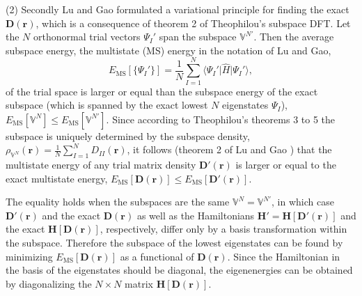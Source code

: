 \documentclass[journal=jpclcd,manuscript=letter]{achemso}
\newcommand\m[1]{\mathbf{#1}}
\renewcommand\vec[1]{\mathbf{#1}}
\begin{document}
(2) Secondly Lu and Gao formulated a variational principle for finding the exact $\m{D}(\vec{r})$, which is a consequence of theorem 2
of Theophilou's subspace DFT. \cite{Theophilou1979}
Let the $N$ orthonormal trial vectors $\Psi_I'$ span the subspace $\mathbb{V}^{N'}$.
Then the average subspace energy, the multistate (MS) energy in the notation of Lu and Gao,
\begin{equation}
  E_{\text{MS}}[\{\Psi_I'\}] = \frac{1}{N} \sum_{I=1}^{N} \langle \Psi_I' \vert \hat{H} \vert \Psi_I' \rangle,
\end{equation}
of the trial space is larger or equal than
the subspace energy of the exact subspace (which is spanned by the exact lowest $N$ eigenstates $\Psi_I$),
$E_{\text{MS}}[\mathbb{V}^N] \leq E_{\text{MS}}[\mathbb{V}^{N'}]$.
Since according to Theophilou's theorems 3 to 5 the subspace is uniquely determined by the subspace density,
$\rho_{\mathbb{V}^N}(\vec{r}) = \frac{1}{N} \sum_{I=1}^{N} D_{II}(\vec{r})$,
it follows (theorem 2 of Lu and Gao \cite{Lu2022JPCL}) that the multistate energy of any trial matrix density $\m{D}'(\vec{r})$
is larger or equal to the exact multistate energy,
 $E_{\text{MS}}[\m{D}(\vec{r})] \leq E_{\text{MS}}[\m{D}'(\vec{r})]$.

The equality holds when the subspaces are the same $\mathbb{V}^N = \mathbb{V}^{N'}$, in which case $\m{D}'(\vec{r})$ and
the exact $\m{D}(\vec{r})$ as well as the Hamiltonians $\m{H}' = \m{H}[\m{D}'(\vec{r})]$ and the exact $\m{H}[\m{D}(\vec{r})]$, respectively,
 differ only by a basis transformation within the subspace. Therefore the subspace of the lowest eigenstates can be found by minimizing
$E_{\text{MS}}[\m{D}(\vec{r})]$ as a functional of $\m{D}(\vec{r})$.
Since the Hamiltonian in the basis of the eigenstates should be diagonal,
the eigenenergies can be obtained by diagonalizing the $N \times N$ matrix $\m{H}[\m{D}(\vec{r})]$.

\end{document}
